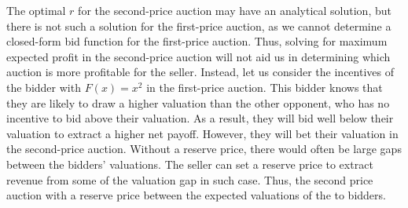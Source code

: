 \documentclass{article}
\begin{document}
\begin{itemize}
	The optimal $r$ for the second-price auction may have an analytical solution, but there is not such a solution for the first-price auction, as we cannot determine a closed-form bid function for the first-price auction. Thus, solving for maximum expected profit in the second-price auction will not aid us in determining which auction is more profitable for the seller. Instead, let us consider the incentives of the bidder with ${F(x)=x^2}$ in the first-price auction. This bidder knows that they are likely to draw a higher valuation than the other opponent, who has no incentive to bid above their valuation. As a result, they will bid well below their valuation to extract a higher net payoff. However, they will bet their valuation in the second-price auction. Without a reserve price, there would often be large gaps between the bidders' valuations. The seller can set a reserve price to extract revenue from some of the valuation gap in such case. Thus, the second price auction with a reserve price between the expected valuations of the to bidders.


\end{itemize}
\end{document}
